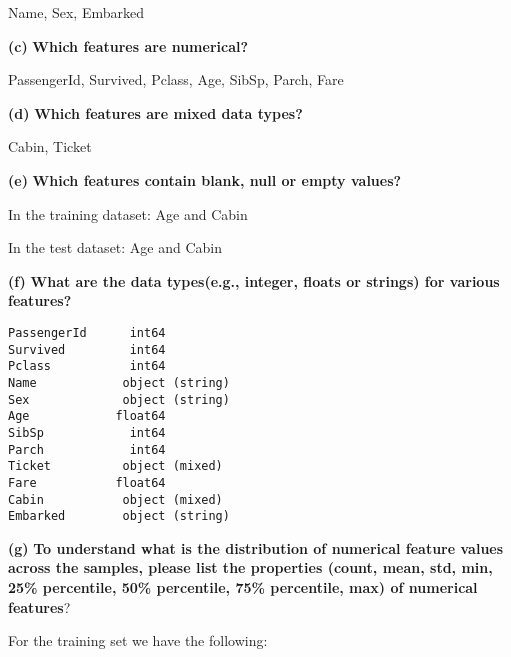 \documentclass[11pt]{article}
\renewcommand\part[1]{\vspace{.10in}\textbf{(#1)}}
\begin{document}
Name,            
Sex,                            
Embarked        

\part{c} \textbf{Which features are numerical?}

PassengerId,      
Survived,         
Pclass,           
Age,            
SibSp,            
Parch,            
Fare           

\part{d} \textbf{Which features are mixed data types?}

Cabin, 
Ticket



\part{e} \textbf{Which features contain blank, null or empty values?}

In the training dataset: Age and Cabin

In the test dataset: Age and Cabin


\part{f} \textbf{What are the data types(e.g., integer, floats or strings) for various features?}

\begin{verbatim}
PassengerId      int64
Survived         int64
Pclass           int64
Name            object (string)
Sex             object (string)
Age            float64
SibSp            int64
Parch            int64
Ticket          object (mixed)
Fare           float64
Cabin           object (mixed)
Embarked        object (string)
\end{verbatim}


\part{g} \textbf{To understand what is the distribution of numerical feature values across the samples, please list the properties (count, mean, std, min, 25\% percentile, 50\% percentile, 75\% percentile, max) of numerical features}?

For the training set we have the following:
\end{document}
